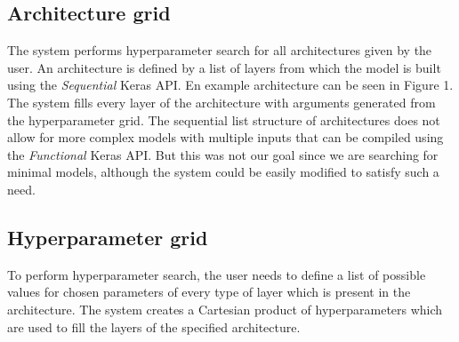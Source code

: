 \documentclass[10pt, a4paper]{article}
\begin{document}
\subsection{Architecture grid}
The system performs hyperparameter search for all architectures
given by the user. 
An architecture is defined by a list of layers from which
the model is built using the \textit{Sequential} Keras API.
En example architecture can be seen in Figure 1.
The system fills every layer of the architecture with
arguments generated from the hyperparameter grid.
The sequential list structure of architectures does not
allow for more complex models with multiple inputs that can be
compiled using the \textit{Functional} Keras API.
But this was not our goal since we are searching for minimal models, 
although the system could be easily modified to satisfy such a need.

\subsection{Hyperparameter grid}
To perform hyperparameter search, the user needs to define
a list of possible values for chosen parameters of every type
of layer which is present in the architecture.
The system creates a Cartesian product of hyperparameters
which are used to fill the layers of the specified architecture.
\end{document}
